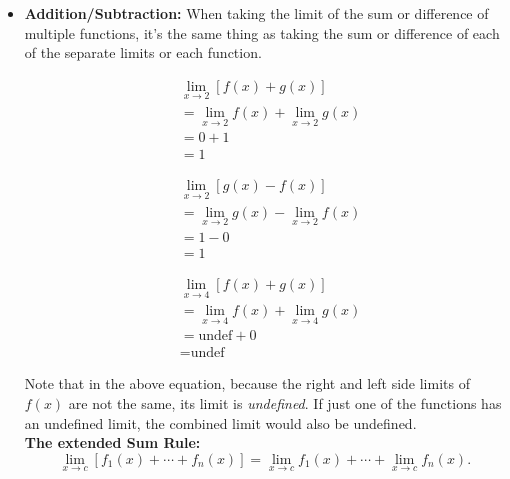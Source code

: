 \documentclass[12pt]{article}
\begin{document}
            \begin{itemize}
                \item \textbf{Addition/Subtraction:}
                    \newline
                    When taking the limit of the sum or difference of multiple functions, it's the same thing as taking the sum or difference of each of the separate limits or each function.
                    \newline
                    \noindent\begin{minipage}{0.5\linewidth}
                        \begin{align*}
                            &\lim_{x \to 2} \left[ f(x) + g(x) \right] \\
                            &= \lim_{x \to 2} f(x) + \lim_{x \to 2} g(x) \\
                            &= 0 + 1 \\
                            &= 1
                        \end{align*}
                    \end{minipage}%
                    \begin{minipage}{0.5\linewidth}
                        \begin{align*}
                            &\lim_{x \to 2} \left[ g(x) - f(x) \right] \\
                            &= \lim_{x \to 2} g(x) - \lim_{x \to 2} f(x) \\
                            &= 1 - 0 \\
                            &= 1
                        \end{align*}
                    \end{minipage}
                    \newline
                    \begin{align*}
                        &\lim_{x \to 4} \left[ f(x) + g(x) \right] \\
                        &= \lim_{x \to 4} f(x) + \lim_{x \to 4} g(x) \\
                        &= \text{undef} + 0 \\
                        &= \text{undef}
                    \end{align*}

                    Note that in the above equation, because the right and left side limits of $f(x)$ are not the same, its limit is \textit{undefined}. If just one of the functions has an undefined limit, the combined limit would also be undefined.
                    \\ \textbf{The extended Sum Rule:}
                    \begin{equation*}
                        \lim_{x \to c} \left[ f_1(x) + \cdots + f_n(x) \right]
                        = \lim_{x \to c} f_1(x) + \cdots + \lim_{x \to c} f_n(x).
                    \end{equation*}
                    \newline


\end{itemize}
\end{document}
